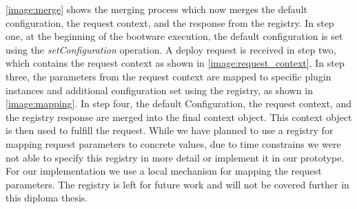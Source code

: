 \autoref{image:merge} shows the merging process which now merges the default configuration, the request context, and the response from the registry.
In step one, at the beginning of the bootware execution, the default configuration is set using the \textit{setConfiguration} operation.
A deploy request is received in step two, which contains the request context as shown in \autoref{image:request_context}.
In step three, the parameters from the request context are mapped to specific plugin instances and additional configuration set using the registry, as shown in \autoref{image:mapping}.
In step four, the default Configuration, the request context, and the registry response are merged into the final context object.
This context object is then used to fulfill the request.
While we have planned to use a registry for mapping request parameters to concrete values, due to time constrains we were not able to specify this registry in more detail or implement it in our prototype.
For our implementation we use a local mechanism for mapping the request parameters.
The registry is left for future work and will not be covered further in this diploma thesis.
